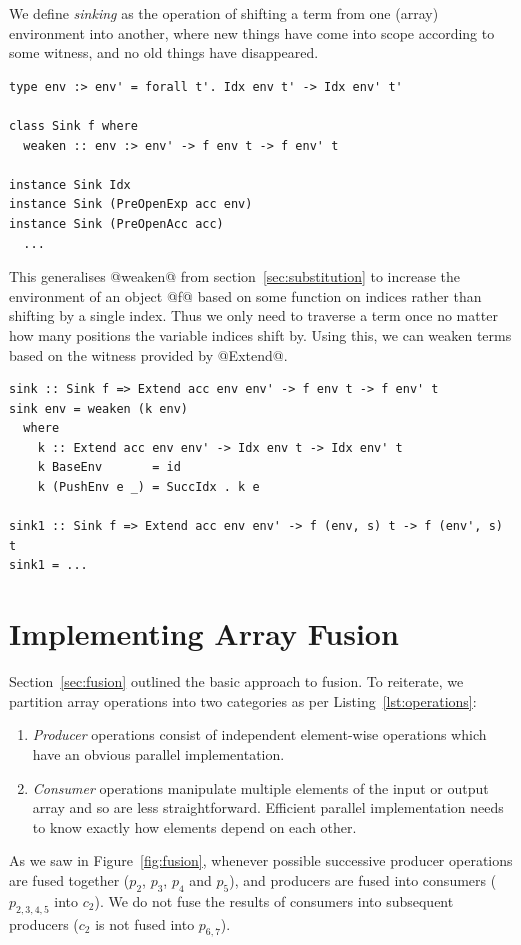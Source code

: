 We define \emph{sinking} as the operation of shifting a term from one (array)
environment into another, where new things have come into scope according to
some witness, and no old things have disappeared.
%
\begin{lstlisting}[style=haskell,
    name=sinking,
    caption={Sinking terms to a larger environment}]
type env :> env' = forall t'. Idx env t' -> Idx env' t'

class Sink f where
  weaken :: env :> env' -> f env t -> f env' t

instance Sink Idx
instance Sink (PreOpenExp acc env)
instance Sink (PreOpenAcc acc)
  ...
\end{lstlisting}
%
This generalises @weaken@ from section~\ref{sec:substitution} to increase
the environment of an object @f@ based on some function on indices rather
than shifting by a single  index. Thus we only need to
traverse a term once no matter how many positions the variable indices shift by.
Using this, we can weaken terms based on the witness provided by
@Extend@.
%
\begin{lstlisting}[style=haskell,name=sinking]
sink :: Sink f => Extend acc env env' -> f env t -> f env' t
sink env = weaken (k env)
  where
    k :: Extend acc env env' -> Idx env t -> Idx env' t
    k BaseEnv       = id
    k (PushEnv e _) = SuccIdx . k e

sink1 :: Sink f => Extend acc env env' -> f (env, s) t -> f (env', s) t
sink1 = ...
\end{lstlisting}


\section{Implementing Array Fusion}
\label{sec:implementing_array_fusion}

Section~\ref{sec:fusion} outlined the basic approach to fusion. To reiterate, we
partition array operations into two categories as per
Listing~\ref{lst:operations}:
%
\begin{enumerate}
    \item {}\emph{Producer} operations consist of independent
        element-wise operations which have an obvious parallel implementation.

    \item {}\emph{Consumer} operations manipulate multiple
        elements of the input or output array and so are less straightforward.
        Efficient parallel implementation needs to know exactly how elements
        depend on each other.
\end{enumerate}
%
As we saw in Figure~\ref{fig:fusion}, whenever possible successive producer
operations are fused together ($p_2$, $p_3$, $p_4$ and $p_5$), and producers are
fused into consumers ($p_{ 2,3,4,5 }$ into $ c_2$). We do not fuse the results
of consumers into subsequent producers ($c_2$ is not fused into $p_{ 6,7 }$).

